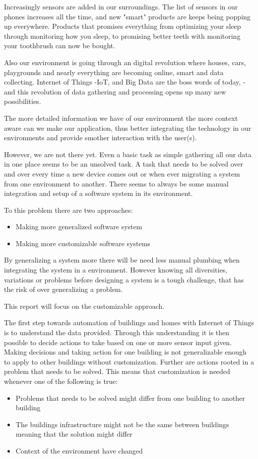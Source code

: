 Increasingly sensors are added in our surroundings. 
The list of sensors in our phones increases all the time, and new "smart" products are keeps being popping up everywhere.
Products that promises everything from optimizing your sleep through monitoring how you sleep\cite{wareable}, to promising better teeth with monitoring your toothbrush\cite{toothbrush} can now be bought.

Also our environment is going through an digital revolution where houses, cars, playgrounds and nearly everything are becoming online, smart and data collecting.
Internet of Things -IoT, and Big Data are the boss words of today, -and this revolution of data gathering and processing opens up many new possibilities.

The more detailed information we have of our environment the more context aware can we make our application, thus better integrating the technology in our environments and provide smother interaction with the user(s).

However, we are not there yet. 
Even a basic task as simple gathering all our data in one place seems to be an unsolved task.
A task that needs to be solved over and over every time a new device comes out or when ever migrating a system from one environment to another. 
There seems to always be some manual integration and setup of a software system in its environment.

To this problem there are two approaches:
\begin{itemize}
\item Making more generalized software system
\item Making more customizable software systems
\end{itemize}

By generalizing a system more there will be need less manual plumbing when integrating the system in a environment. 
However knowing all diversities, variations or problems before designing a system is a tough challenge, that has the risk of over generalizing a problem.

This report will focus on the customizable approach.


The first step towards automation of buildings and homes with Internet of Things is to understand the data provided. 
Through this understanding it is then possible to decide actions to take based on one or more sensor input given. 
Making decisions and taking action for one building is not generalizable enough to apply to other buildings without customization. 
Further are actions rooted in a problem that needs to be solved. 
This means that customization is needed whenever one of the following is true:
\begin{itemize}
\item Problems that needs to be solved might differ from one building to another building
\item The buildings infrastructure might not be the same between buildings meaning that the solution might differ
\item Context of the environment have changed
\end{itemize}


